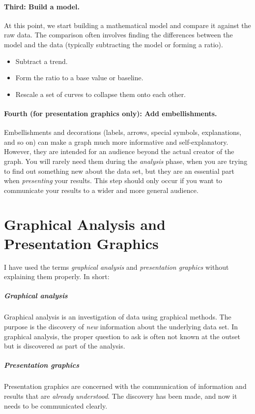 \paragraph{Third: Build a model.} At this point, we start building a
mathematical model and compare it against the raw data. The comparison
often involves finding the differences between the model and the data
(typically subtracting the model or forming a ratio).
\begin{itemize}
\item Subtract a trend.
\item Form the ratio to a base value or baseline.
\item Rescale a set of curves to collapse them onto each other.
\end{itemize}

\paragraph{Fourth (for presentation graphics only): Add embellishments.} Embellishments 
and decorations (labels, arrows, special symbols, explanations, and so
on) can make a graph much more informative and self-explanatory.
However, they are intended for an audience beyond the actual creator
of the graph. You will rarely need them during the \emph{analysis}
phase, when you are trying to find out something new about the data
set, but they are an essential part when \emph{presenting} your
results. This step should only occur if you want to communicate your
results to a wider and more general audience.

\section{Graphical Analysis and Presentation Graphics}

 
I have used the terms \emph{graphical analysis} and \emph{presentation
  graphics} without explaining them properly. In short:

\begin{unnumlist}
\subparagraph{Graphical analysis}
\item Graphical analysis is an investigation of
  data using graphical methods. The purpose is the discovery of
  \emph{new} information about the underlying data set. In graphical
  analysis, the proper question to ask is often not known at the
  outset but is discovered as part of the analysis.

\subparagraph{Presentation graphics}
\item Presentation graphics are concerned with
  the communication of information and results that are \emph{already
    understood}. The discovery has been made, and now it needs to be
  communicated clearly.
\end{unnumlist}

